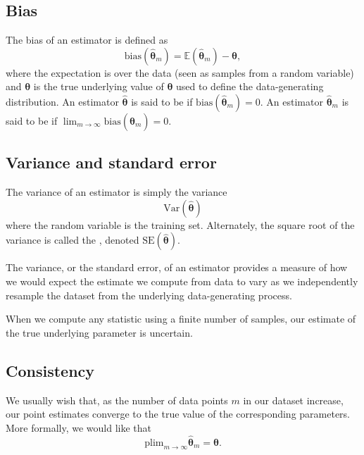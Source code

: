 \subsection{Bias}

The bias of an estimator is defined as
\begin{equation}
  \mathrm{bias}(\hat{\bm{\theta}}_m) = \mathbb{E}(\hat{\bm{\theta}}_m) - \bm{\theta},
\end{equation}
where the expectation is over the data (seen as samples from a random variable) and $\bm{\theta}$ is the true underlying value of $\bm{\theta}$ used to define the data-generating distribution.
An estimator $\hat{\bm{\theta}}$ is said to be  if $\mathrm{bias}(\hat{\bm{\theta}}_m)=0$.
An estimator  $\hat{\bm{\theta}}_m$ is said to be  if $\lim_{m\rightarrow \infty}\mathrm{bias}(\hat{\bm{\theta}}_m) = 0$.

\subsection{Variance and standard error}

The variance of an estimator is simply the variance
\begin{equation}
  \mathrm{Var}(\hat{\bm{\theta}})
\end{equation}
where the random variable is the training set.
Alternately, the square root of the variance is called the , denoted $\mathrm{SE}(\hat{\bm{\theta}})$.

The variance, or the standard error, of an estimator provides a measure of how we would expect the estimate we compute from data to vary as we independently resample the dataset from the underlying data-generating process.


\begin{tcolorbox}
  When we compute any statistic using a finite number of samples, our estimate of the true underlying parameter is uncertain.
\end{tcolorbox}


\subsection{Consistency}

We usually wish that, as the number of data points $m$ in our dataset increase, our point estimates converge to the true value of the corresponding parameters.
More formally, we would like that
\begin{equation}
  \label{eq:consistency}
  \mathrm{plim}_{m\rightarrow \infty}\hat{\bm{\theta}}_m = \bm{\theta}.
\end{equation}


